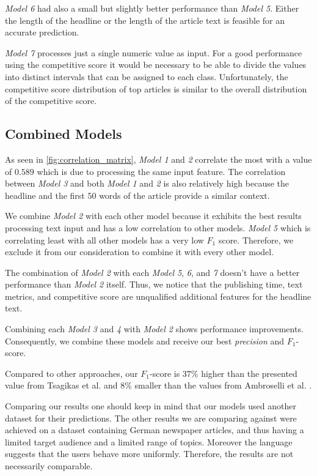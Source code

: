 \textit{Model 6} had also a small but slightly better performance than \textit{Model 5}. 
Either the length of the headline or the length of the article text is feasible for an accurate prediction.

\textit{Model 7} processes just a single numeric value as input. For a good performance using the competitive score it would be necessary to be able to divide the values into distinct intervals that can be assigned to each class.
Unfortunately, the competitive score distribution of top articles is similar to the overall distribution of the competitive score.



\subsection{Combined Models}
As seen in \autoref{fig:correlation_matrix}, \textit{Model 1} and \textit{2} correlate the most with a value of $0.589$ which is due to processing the same input feature.
The correlation between \textit{Model 3} and both \textit{Model 1} and \textit{2} is also relatively high because the headline and the first $50$ words of the article provide a similar context.

We combine \textit{Model 2} with each other model because it exhibits the best results processing text input and has a low correlation to other models.
\textit{Model 5} which is correlating least with all other models has a very low $F_1$ score. Therefore, we exclude it from our consideration to combine it with every other model.

The combination of \textit{Model 2} with each \textit{Model 5}, \textit{6}, and \textit{7} doesn't have a better performance than \textit{Model 2} itself. 
Thus, we notice that the publishing time, text metrics, and competitive score are unqualified additional features for the headline text.

Combining each \textit{Model 3} and \textit{4} with \textit{Model 2} shows performance improvements. Consequently, we combine these models and receive our best \textit{precision} and $F_1$-score.



Compared to other approaches, our $F_1$-score is $37\%$ higher than the presented value from Tsagikas et al. and $8\%$ smaller than the values from Ambroselli et al. \cite{ambroselli2018prediction}.



Comparing our results one should keep in mind that our models used another dataset for their predictions.
The other results we are comparing against were achieved on a dataset containing German newspaper articles, and thus having a limited target audience and a limited range of topics.
Moreover the language suggests that the users behave more uniformly.
Therefore, the results are not necessarily comparable.
